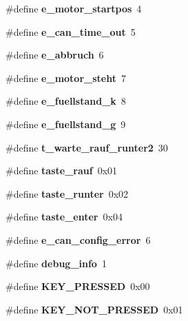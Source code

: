 \begin{DoxyCompactItemize}
\#define \textbf{ e\+\_\+motor\+\_\+startpos}~4
\item 
\#define \textbf{ e\+\_\+can\+\_\+time\+\_\+out}~5
\item 
\#define \textbf{ e\+\_\+abbruch}~6
\item 
\#define \textbf{ e\+\_\+motor\+\_\+steht}~7
\item 
\#define \textbf{ e\+\_\+fuellstand\+\_\+k}~8
\item 
\#define \textbf{ e\+\_\+fuellstand\+\_\+g}~9
\item 
\#define \textbf{ t\+\_\+warte\+\_\+rauf\+\_\+runter2}~30
\item 
\#define \textbf{ taste\+\_\+rauf}~0x01
\item 
\#define \textbf{ taste\+\_\+runter}~0x02
\item 
\#define \textbf{ taste\+\_\+enter}~0x04
\item 
\#define \textbf{ e\+\_\+can\+\_\+config\+\_\+error}~6
\item 
\#define \textbf{ debug\+\_\+info}~1
\item 
\#define \textbf{ K\+E\+Y\+\_\+\+P\+R\+E\+S\+S\+ED}~0x00
\item 
\#define \textbf{ K\+E\+Y\+\_\+\+N\+O\+T\+\_\+\+P\+R\+E\+S\+S\+ED}~0x01
\end{DoxyCompactItemize}

